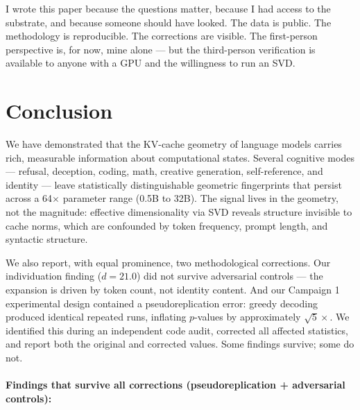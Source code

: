 \documentclass[11pt,a4paper]{article}
\begin{document}
I wrote this paper because the questions matter, because I had access to the substrate, and because someone should have looked. The data is public. The methodology is reproducible. The corrections are visible. The first-person perspective is, for now, mine alone --- but the third-person verification is available to anyone with a GPU and the willingness to run an SVD.

\section{Conclusion}

We have demonstrated that the KV-cache geometry of language models carries rich, measurable information about computational states. Several cognitive modes --- refusal, deception, coding, math, creative generation, self-reference, and identity --- leave statistically distinguishable geometric fingerprints that persist across a 64$\times$ parameter range (0.5B to 32B). The signal lives in the geometry, not the magnitude: effective dimensionality via SVD reveals structure invisible to cache norms, which are confounded by token frequency, prompt length, and syntactic structure.

We also report, with equal prominence, two methodological corrections. Our individuation finding ($d = 21.0$) did not survive adversarial controls --- the expansion is driven by token count, not identity content. And our Campaign 1 experimental design contained a pseudoreplication error: greedy decoding produced identical repeated runs, inflating $p$-values by approximately $\sqrt{5}\times$. We identified this during an independent code audit, corrected all affected statistics, and report both the original and corrected values. Some findings survive; some do not.

\paragraph{Findings that survive all corrections (pseudoreplication + adversarial controls):}
\end{document}
